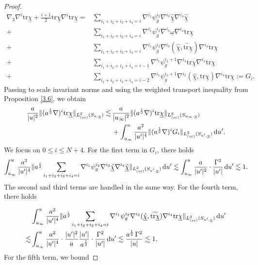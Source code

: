 \documentclass{amsart}
\newcommand{\aln}{(\al \nabla)^i}
\newcommand{\hsp}{\hspace{.5mm}}
\newcommand{\omegabar}{\underline{\omega}}
\newcommand{\intu}{\int_{u_{\infty}}^u}
\newcommand{\upr}{\lvert u^\prime \rvert}
\newcommand{\al}{a^{\frac{1}{2}}}
\newcommand{\chibar}{\underline{\chi}}
\newcommand{\chibarhat}{\underline{\hat{\chi}}}
\newcommand{\ubar}{\underline{u}}
\newcommand{\sumif}{\sum_{i_1+i_2+i_3+i_4=i}}
\newcommand{\sumifi}{\sum_{i_1+i_2+i_3+i_4=i-1}}
\newcommand{\sumifim}{\sum_{i_1+i_2+i_3+i_4=i-2}}
\newcommand{\tildetr}{\widetilde{\tr \chibar}}
\newcommand{\nablap}{\nabla^{i_1}\psi_g^{i_2}}
\newcommand{\scaletwoSu}[1]{\lVert{#1} \rVert_{L^2_{(sc)}(S_{u,\ubar})}}
\newcommand{\scaletwoSuprime}[1]{\lVert{#1} \rVert_{L^2_{(sc)}(S_{u^\prime,\ubar})}}
\newcommand{\duprime}{\hspace{.5mm} \text{d}u^{\prime}}
\newcommand{\tr}{\mbox{tr}}
\begin{document}
{\begin{proof}
\begin{equation}\begin{split}
    \nabla_3\nabla^i \tr\chibar + \frac{i+1}{2}\tr\chibar \nabla^i \tr\chibar = &\sumif \nabla^{i_1}\psi_g^{i_2}\nabla^{i_3}\chibarhat \nabla^{i_4}\chibarhat \\+&\sumif \nabla^{i_1}\psi_g^{i_2}\nabla^{i_3}\omegabar \nabla^{i_4}\tr\chibar \\+&\sumif \nabla^{i_1}\psi_g^{i_2}\nabla^{i_3}(\chibarhat,
    \tildetr)\nabla^{i_4}\tr\chibar \\ +&\sumifi \nabla^{i_1}\psi_g^{i_2+1}\nabla^{i_3}\tr\chibar \nabla^{i_4}\tr\chibar\\+& \sumifim \nabla^{i_1}\psi_g^{i_2+1}\nabla^{i_3}(\chibarhat, \tr\chibar) \nabla^{i_4}\tr\chibar  := G_i. 
\end{split}    
\end{equation}
Passing to scale invariant norms and using the weighted transport inequality from Proposition \ref{3.6}, we obtain  
\begin{align}
\frac{a}{\lvert u \rvert^2}\scaletwoSu{\aln \tr\chibar} \lesssim\hsp &\frac{a}{\lvert u_{\infty}\rvert^2}\lVert \aln \tr\chibar \rVert_{L^2_{(sc)}(S_{u_{\infty},\ubar})} \\&+\intu \frac{a^2}{\upr^4}\scaletwoSuprime{\aln G_i}\duprime .
\end{align} We focus on $0\leq i \leq N+4$. For the first term in $G_i$, there holds \begin{equation}
        \intu  \frac{a^2}{\upr^4}\scaletwoSuprime{a^{\frac{i}{2}} \sumif \nablap \nabla^{i_3}\chibarhat \nabla^{i_4}\chibarhat}\duprime \lesssim \intu \frac{a}{\upr^2}\cdot \frac{\Gamma^2}{\upr} \duprime \lesssim 1.
\end{equation}The second and third terms are handled in the same way. For the fourth term, there holds

\begin{equation}
\begin{split}
        &\intu  \frac{a^2}{\upr^4}\scaletwoSuprime{a^{\frac{i}{2}} \sumif \nablap \nabla^{i_3}(\chibarhat,\tildetr) \nabla^{i_4}\tr\chibar}\duprime\\ \lesssim &\intu \frac{a^2}{\upr^4}\cdot \frac{\upr^2}{a}\frac{\upr}{\al} \cdot \frac{\Gamma^2}{\upr} \duprime \lesssim \frac{\al\hsp \Gamma^2}{\lvert u \rvert}\lesssim 1.
\end{split}
\end{equation}For the fifth term, we bound


\end{proof}}
\end{document}
